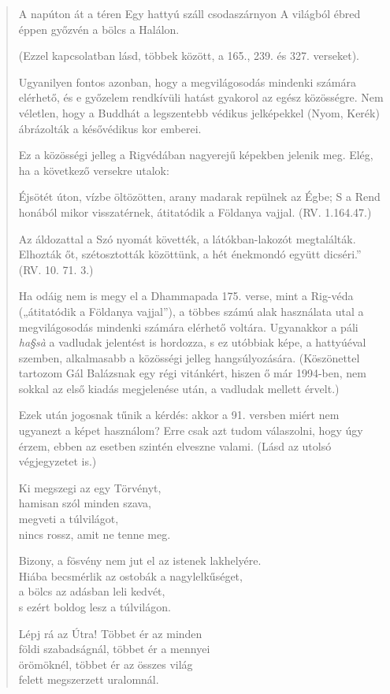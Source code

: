 \begin{verse}
{A napúton át a téren 
Egy hattyú száll csodaszárnyon 
A világból ébred éppen 
győzvén a bölcs a Halálon.

(Ezzel kapcsolatban lásd, többek között, a 165., 239. és 327. verseket). 

Ugyanilyen fontos azonban, hogy a megvilágosodás mindenki számára elérhető, és e győzelem rendkívüli hatást gyakorol az egész közösségre. Nem véletlen, hogy a Buddhát a legszentebb védikus jelképekkel (Nyom, Kerék) ábrázolták a késővédikus kor emberei.

Ez a közösségi jelleg a Rigvédában nagyerejű képekben jelenik meg. Elég, ha a következő versekre utalok:

Éjsötét úton, vízbe öltözötten, 
arany madarak repülnek az Égbe; 
S a Rend honából mikor visszatérnek, 
átitatódik a Földanya vajjal. (RV. 1.164.47.)

Az áldozattal a Szó nyomát követték, 
a látókban-lakozót megtalálták.
Elhozták őt, szétosztották közöttünk, 
a hét énekmondó együtt dicséri.” (RV. 10. 71. 3.)

Ha odáig nem is megy el a Dhammapada 175. verse, mint a Rig-véda („átitatódik a Földanya vajjal”), a többes számú alak használata utal a megvilágosodás mindenki számára elérhető voltára. Ugyanakkor a páli \textit{ha§sà} a vadludak jelentést is hordozza, s ez utóbbiak képe, a hattyúéval szemben, alkalmasabb a közösségi jelleg hangsúlyozására. (Köszönettel tartozom Gál Balázsnak egy régi vitánkért, hiszen ő már 1994-ben, nem sokkal az első kiadás megjelenése után, a vadludak mellett érvelt.) 

Ezek után jogosnak tűnik a kérdés: akkor a 91. versben miért nem ugyanezt a képet használom? Erre csak azt tudom válaszolni, hogy úgy érzem, ebben az esetben szintén elveszne valami. (Lásd az utolsó végjegyzetet is.)}

 Ki megszegi az egy Törvényt,\\
hamisan szól minden szava,\\
megveti a túlvilágot,\\
nincs rossz, amit ne tenne meg.

 Bizony, a fösvény nem jut el az istenek lakhelyére.\\
Hiába becsmérlik az ostobák a nagylelkűséget,\\
a bölcs az adásban leli kedvét,\\
s ezért boldog lesz a túlvilágon.

 Lépj rá az Útra! Többet ér az minden\\
földi szabadságnál, többet ér a mennyei\\
örömöknél, többet ér az összes világ\\
felett megszerzett uralomnál.

\end{verse}
